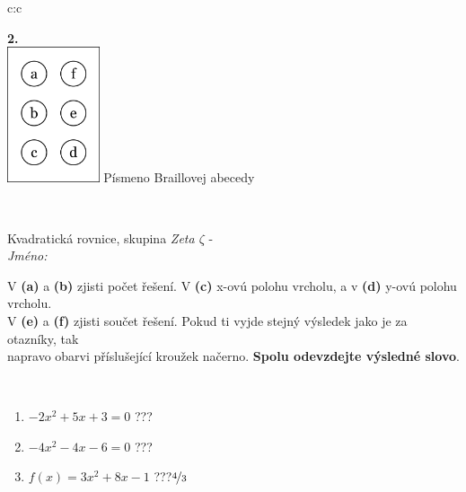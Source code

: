 \documentclass[10pt]{report}
\begin{document}
\begin{tabular}{c:c}
\begin{minipage}[c][104.5mm][t]{0.5\linewidth}
\begin{center}
\begin{minipage}{0.20\linewidth}
\begin{center}
{\Huge\bfseries 2.} \\[2mm]
\includegraphics[height=40mm]{../images/braille.png}
{\small Písmeno Braillovej abecedy}
\end{center}
\end{minipage}
\end{center}
\end{minipage}
\\ \hdashline
\begin{minipage}[c][104.5mm][t]{0.5\linewidth}
\begin{center}
\vspace{7mm}
{\huge Kvadratická rovnice, skupina \textit{Zeta $\zeta$} -}\\[5mm]
\textit{Jméno:}\phantom{xxxxxxxxxxxxxxxxxxxxxxxxxxxxxxxxxxxxxxxxxxxxxxxxxxxxxxxxxxxxxxxxx}\\[5mm]
\begin{minipage}{0.95\linewidth}
\begin{center}
V \textbf{(a)} a \textbf{(b)} zjisti počet řešení. V \textbf{(c)} x-ovú polohu vrcholu, a v \textbf{(d)} y-ovú polohu vrcholu.\\V \textbf{(e)} a \textbf{(f)} zjisti součet řešení. Pokud ti vyjde stejný výsledek jako je za otazníky, tak\\napravo obarvi příslušející kroužek načerno. \textbf{Spolu odevzdejte výsledné slovo}.
\end{center}
\end{minipage}
\\[1mm]
\begin{minipage}{0.79\linewidth}
\begin{center}
\begin{varwidth}{\linewidth}
\begin{enumerate}
\Large
\item $-2x^2+5x+3=0$\quad \dotfill\; ???\;\dotfill {}
\item $-4x^2-4x-6=0$\quad \dotfill\; ???\;\dotfill {}
\item $f(x)=3x^2+8x-1$\quad \dotfill\; ???\;\dotfill \quad $\nicefrac{4}{3}$

\end{enumerate}
\end{varwidth}
\end{center}
\end{minipage}
\end{center}
\end{minipage}
\end{tabular}
\end{document}
